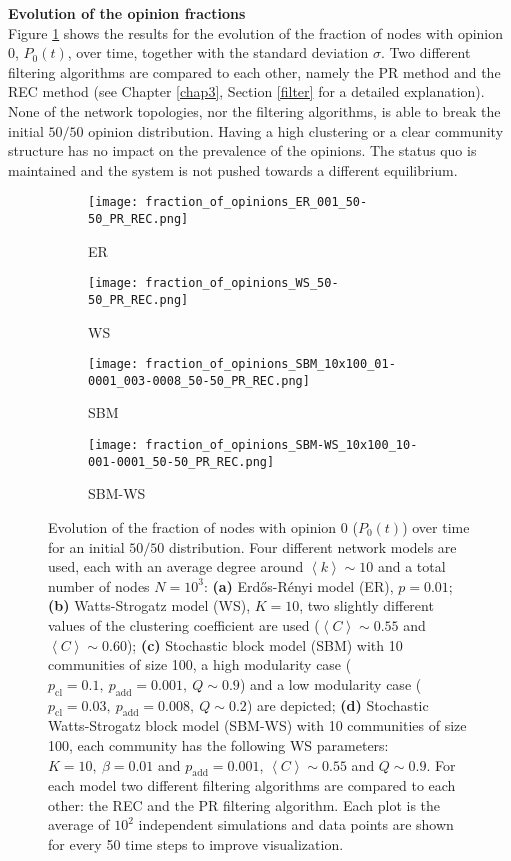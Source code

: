 \documentclass[11 pt , letterpaper , twoside , openright]{book}
\begin{document}
\textbf{Evolution of the opinion fractions}\\
\newline
Figure \ref{ev_op_50_50} shows the results for the evolution of the fraction of nodes with opinion 0, $P_0(t)$, over time, together with the standard deviation $\sigma$. Two different filtering algorithms are compared to each other, namely the PR method and the REC method (see Chapter \ref{chap3}, Section \ref{filter} for a detailed explanation). None of the network topologies, nor the filtering algorithms, is able to break the initial $50/50$ opinion distribution. Having a high clustering or a clear community structure has no impact on the prevalence of the opinions. The status quo is maintained and the system is not pushed towards a different equilibrium.
\newpage
\begin{figure}[H]
  \begin{subfigure}[b]{0.49\textwidth}
  	\texttt{[image: fraction\_of\_opinions\_ER\_001\_50-50\_PR\_REC.png]}
    \caption{ER}
  \end{subfigure}
  \begin{subfigure}[b]{0.49\textwidth}
  	\texttt{[image: fraction\_of\_opinions\_WS\_50-50\_PR\_REC.png]}
    \caption{WS}
  \end{subfigure}
  \begin{subfigure}[b]{0.49\textwidth}
    \texttt{[image: fraction\_of\_opinions\_SBM\_10x100\_01-0001\_003-0008\_50-50\_PR\_REC.png]}
    \caption{SBM}
  \end{subfigure}
  \begin{subfigure}[b]{0.49\textwidth}
    \texttt{[image: fraction\_of\_opinions\_SBM-WS\_10x100\_10-001-0001\_50-50\_PR\_REC.png]}
    \caption{SBM-WS}
  \end{subfigure}
  \captionsetup{format=plain}
  \caption[Evolution of the fraction of nodes with opinion 0 ($P_0(t)$) over time for an initial $50/50$ opinion distribution.]{Evolution of the fraction of nodes with opinion 0 ($P_0(t)$) over time for an initial $50/50$ distribution. Four different network models are used, each with an average degree around $\left<k\right> \sim 10$ and a total number of nodes $N = 10^3$: \textbf{(a)} Erd\H{o}s-R\'{e}nyi model (ER), $p=0.01$; \textbf{(b)} Watts-Strogatz model (WS), $K = 10$, two slightly different values of the clustering coefficient are used ($\left<C\right> \sim 0.55$ and $\left<C\right> \sim 0.60$); \textbf{(c)} Stochastic block model (SBM) with 10 communities of size 100, a high modularity case ($p_{\text{cl}} = 0.1,\ p_{\text{add}} = 0.001,\ Q \sim 0.9$) and a low modularity case ($p_{\text{cl}} = 0.03,\ p_{\text{add}} = 0.008,\ Q \sim 0.2$) are depicted; \textbf{(d)} Stochastic Watts-Strogatz block model (SBM-WS) with 10 communities of size 100, each community has the following WS parameters: $K = 10,\ \beta = 0.01$ and $p_{\text{add}} = 0.001$, $\left<C\right> \sim 0.55$ and $Q \sim 0.9$. For each model two different filtering algorithms are compared to each other: the REC and the PR filtering algorithm. Each plot is the average of $10^2$ independent simulations and data points are shown for every 50 time steps to improve visualization.}%
\label{ev_op_50_50}
\end{figure}
\end{document}
